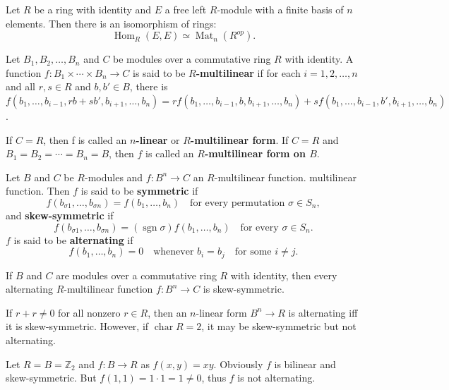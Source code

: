 \documentclass{article}
\DeclareMathOperator{\Hom}{Hom}
\DeclareMathOperator{\Mat}{Mat}
\begin{document}
\begin{theorem}
    Let $R$ be a ring with identity and $E$ a free left $R$-module with a finite basis of $n$ elements. Then there is an isomorphism of rings:
    \begin{equation*}
        \Hom_{R}(E, E) \simeq \Mat_n(R^{op}).
    \end{equation*}
\end{theorem}

\begin{definition}
    Let $B_1, B_2, \ldots, B_n$ and $C$ be modules over a commutative ring $R$ with identity. A function $f:B_{1} \times \cdots \times B_{n} \to C$ is said to be \textbf{$R$-multilinear} if for each $i=1,2, \ldots,n $ and all $r,s \in R$ and $b,b' \in B$, there is $f(b_{1}, \ldots,b_{i-1},rb+sb',b_{i+1}, \ldots,b_{n})=rf(b_{1}, \ldots,b_{i-1},b,b_{i+1}, \ldots,b_{n})+sf(b_{1}, \ldots,b_{i-1},b',b_{i+1}, \ldots,b_{n})$.

    If $C=R$, then f is called an \textbf{$n$-linear} or \textbf{$R$-multilinear form}. If $C=R$ and $B_{1}=B_{2}=\cdots=B_{n}=B$, then $f$ is called an \textbf{$R$-multilinear form on $B$}.
\end{definition}

\begin{definition}
    Let $B$ and $C$ be $R$-modules and $f:B^n \to C$ an $R$-multilinear function. multilinear function. Then $f$ is said to be \textbf{symmetric} if
    $$f(b_{\sigma 1}, \dots, b_{\sigma n}) = f(b_1, \dots, b_n) \quad \text{for every permutation } \sigma \in S_n,$$
    and \textbf{skew-symmetric} if
    $$f(b_{\sigma 1}, \dots, b_{\sigma n}) = (\operatorname{sgn} \sigma) f(b_1, \dots, b_n) \quad \text{for every } \sigma \in S_n.$$
    $f$ is said to be \textbf{alternating} if
    $$f(b_1, \dots, b_n) = 0 \quad \text{whenever } b_i = b_j \quad \text{for some } i \neq j.$$
\end{definition}

\begin{theorem}
    If $B$ and $C$ are modules over a commutative ring $R$ with identity, then every alternating $R$-multilinear function $f : B^n \to C$ is skew-symmetric.
\end{theorem}
If $r+r\neq 0$ for all nonzero $r \in R$, then an $n$-linear form $B^n \to R$ is alternating iff it is skew-symmetric. However, if $\operatorname{char} R=2$, it may be skew-symmetric but not alternating.
\begin{example}
    Let $R=B=\mathbb{Z}_{2}$ and $f:B\to R$ as $f(x,y)=xy$. Obviously $f$ is bilinear and skew-symmetric. But $f(1,1)=1\cdot 1 =1\neq 0$, thus $f$ is not alternating.
\end{example}
\end{document}
